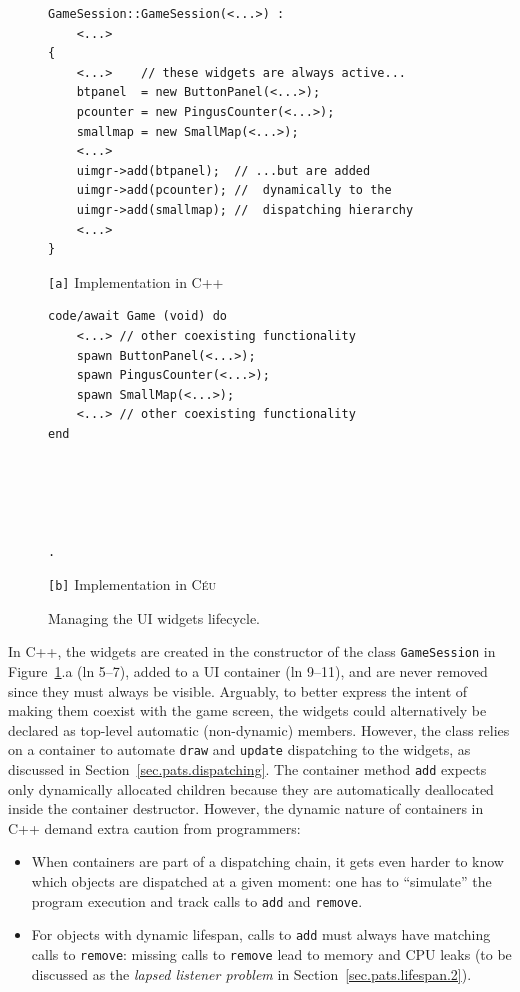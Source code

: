 \documentclass[times,twocolumn,final]{elsarticle}
\newcommand{\CEU}{\textsc{C\'{e}u}\xspace}
\newcommand{\code}[1] {{\small{\texttt{#1}}}}
\newcommand{\ax}{\code{[a]}\xspace}
\newcommand{\bx}{\code{[b]}\xspace}
\begin{document}
\begin{figure}
\begin{minipage}[t]{0.50\linewidth}
\begin{lstlisting}[numbers=right]
GameSession::GameSession(<...>) :
    <...>
{
    <...>    // these widgets are always active...
    btpanel  = new ButtonPanel(<...>);
    pcounter = new PingusCounter(<...>);
    smallmap = new SmallMap(<...>);
    <...>
    uimgr->add(btpanel);  // ...but are added
    uimgr->add(pcounter); //  dynamically to the
    uimgr->add(smallmap); //  dispatching hierarchy
    <...>
}
\end{lstlisting}
\centering\small{\ax Implementation in C++}
\end{minipage}
%
\begin{minipage}[t]{0.50\linewidth}
\begin{lstlisting}[xleftmargin=2em]
code/await Game (void) do
    <...> // other coexisting functionality
    spawn ButtonPanel(<...>);
    spawn PingusCounter(<...>);
    spawn SmallMap(<...>);
    <...> // other coexisting functionality
end





.
\end{lstlisting}
\centering\small{\bx Implementation in \CEU}
\end{minipage}
\caption{ Managing the UI widgets lifecycle.
\label{lst.ui}
}
\end{figure}

In C++, the widgets are created in the constructor of the class
\code{GameSession} in Figure~\ref{lst.ui}.a (ln 5--7), added to a UI container
(ln 9--11), and are never removed since they must always be visible.
Arguably, to better express the intent of making them coexist with the game
screen, the widgets could alternatively be declared as top-level automatic
(non-dynamic) members.
However, the class relies on a container to automate \code{draw} and
\code{update} dispatching to the widgets, as discussed in
Section~\ref{sec.pats.dispatching}.
The container method \code{add} expects only dynamically allocated children
because they are automatically deallocated inside the container destructor.
%
However, the dynamic nature of containers in C++ demand extra caution from
programmers:
%
\begin{itemize}
\item When containers are part of a dispatching chain, it gets even harder to
      know which objects are dispatched at a given moment:
      one has to ``simulate'' the program execution and track calls to
      \code{add} and \code{remove}.
\item For objects with dynamic lifespan, calls to \code{add} must always have
      matching calls to \code{remove}:
      missing calls to \code{remove} lead to memory and CPU leaks (to be
      discussed as the \emph{lapsed listener problem} in
      Section~\ref{sec.pats.lifespan.2}).
\end{itemize}
\end{document}
